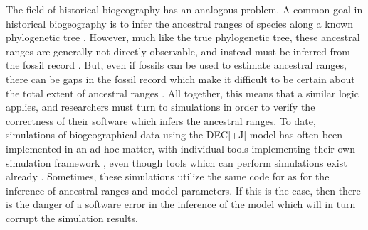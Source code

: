\documentclass{article}
\begin{document}
The field of historical biogeography has an analogous problem.
A common goal in historical biogeography is to infer the ancestral ranges
of species along a known phylogenetic tree 
\citep{varela_phylogeny_2019, baker_global_2013, vicente_and_2017}.
However, much like the true phylogenetic tree, these ancestral ranges are
generally not directly observable, and instead must be inferred from the fossil
record \cite{mclachlan_reconstructing_2004}.
But, even if fossils can be used to estimate ancestral ranges, there can be gaps
in the fossil record which make it difficult to be certain about the total
extent of ancestral ranges \cite{kidwell_quality_2002}.
All together, this means that a similar logic applies, and researchers must turn
to simulations in order to verify the correctness of their software which infers
the ancestral ranges.
To date, simulations of biogeographical data using the DEC[+J] model has often
been implemented in an ad hoc matter, with individual tools implementing their
own simulation framework \cite{matzke_statistical_2022,
bettisworth_lagrange-ng_2023}, even though tools which can perform simulations
exist already \citep{hohna_revbayes_2016}.
Sometimes, these simulations utilize the same code for as for the inference of
ancestral ranges and model parameters.
If this is the case, then there is the danger of 
a software error in the inference of the model which will in turn corrupt the
simulation results.
\end{document}
